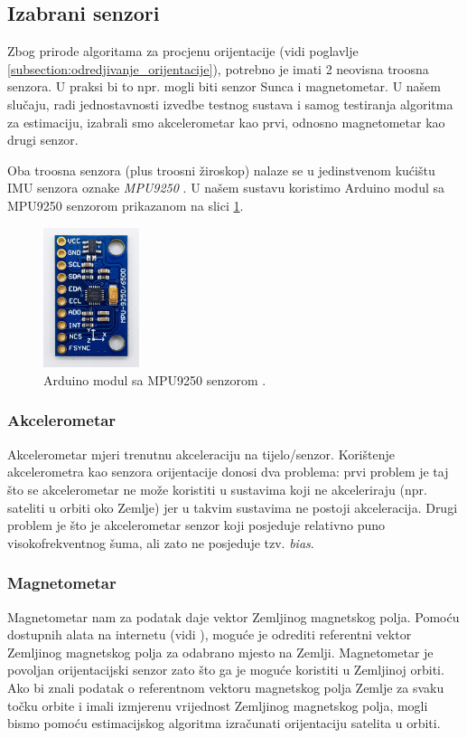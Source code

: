 \documentclass[times, utf8, diplomski, numeric]{templates/template}
\begin{document}
{{        \subsection{Izabrani senzori}{
            Zbog prirode algoritama za procjenu orijentacije (vidi poglavlje \ref{subsection:odredjivanje_orijentacije}), potrebno je imati 2 neovisna troosna senzora. U praksi bi to npr. mogli biti senzor Sunca i magnetometar. U našem slučaju, radi jednostavnosti izvedbe testnog sustava i samog testiranja algoritma za estimaciju, izabrali smo akcelerometar kao prvi, odnosno magnetometar kao drugi senzor. 

            Oba troosna senzora (plus troosni žiroskop) nalaze se u jedinstvenom kućištu IMU senzora oznake \emph{MPU9250} \cite{mpu9250_datasheet}. U našem sustavu koristimo Arduino modul sa MPU9250 senzorom prikazanom na slici \ref{fig:mpu9250}.

            \begin{figure}[htb]
            \centering
            \includegraphics[width=0.25\textwidth]{images/mpu9250.jpg}
            \caption{Arduino modul sa MPU9250 senzorom \cite{wolles_mpu9250}.}
            \label{fig:mpu9250}
            \end{figure}

            \subsubsection{Akcelerometar}{
                Akcelerometar mjeri trenutnu akceleraciju na tijelo/senzor. Korištenje akcelerometra kao senzora orijentacije donosi dva problema: prvi problem je taj što se akcelerometar ne može koristiti u sustavima koji ne akceleriraju (npr. sateliti u orbiti oko Zemlje) jer u takvim sustavima ne postoji akceleracija. Drugi problem je što je akcelerometar senzor koji posjeduje relativno puno visokofrekventnog šuma, ali zato ne posjeduje tzv. \emph{bias}. 
            }

            \subsubsection{Magnetometar}{
                Magnetometar nam za podatak daje vektor Zemljinog magnetskog polja. Pomoću dostupnih alata na internetu (vidi \cite{magnetic_model}), moguće je odrediti referentni vektor Zemljinog magnetskog polja za odabrano mjesto na Zemlji. Magnetometar je povoljan orijentacijski senzor zato što ga je moguće koristiti u Zemljinoj orbiti. Ako bi znali podatak o referentnom vektoru magnetskog polja Zemlje za svaku točku orbite i imali izmjerenu vrijednost Zemljinog magnetskog polja, mogli bismo pomoću estimacijskog algoritma izračunati orijentaciju satelita u orbiti.
            }

}}}
\end{document}
